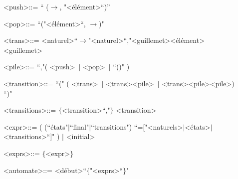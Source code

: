 \documentclass[a4paper,14pt,UTF8]{article}
\begin{document}
\begin{itemize}
\begin{description}
				\item[] \textless push\textgreater ::= `` ($\to$, "\textless élément\textgreater   ``)''\par
				
				\item[] \textless pop\textgreater ::= ``("\textless élément\textgreater  ``, $\to$)" \par
				
				\item[] \textless trans\textgreater ::= \textless naturel\textgreater ``$\to$"\textless naturel\textgreater ``,"\textless guillemet\textgreater \textless élément\textgreater \textless guillemet\textgreater \par
				
				\item[] \textless pile\textgreater ::= ``,"( \textless push\textgreater \ $|$ \textless pop\textgreater \ $|$ ``()" ) \par
				
				\item[] \textless transition\textgreater ::= ``(" ( \textless trans\textgreater \ $|$ \textless trans\textgreater \textless pile\textgreater \ $|$ \textless trans\textgreater \textless pile\textgreater \textless pile\textgreater ) ``)" \par
				
				\item[] \textless transitions\textgreater ::= $\lbrace$\textless transition\textgreater ``,"$\rbrace$ \textless transition\textgreater \par
				
				\item[] \textless expr\textgreater ::= ( (``états"$|$``final"$|$``transitions") ``=["\textless naturels\textgreater $|$\textless états\textgreater $|$\textless transitions\textgreater ``]" ) $|$ \textless initial\textgreater \par
				
				\item[] \textless exprs\textgreater ::= $\lbrace$\textless expr\textgreater$\rbrace$ \par
				
				\item[] \textless automate\textgreater ::= \textless début\textgreater ``$\lbrace$"\textless exprs\textgreater  ``$\rbrace$" \par

			\end{description}
		

\end{itemize}
\end{document}
